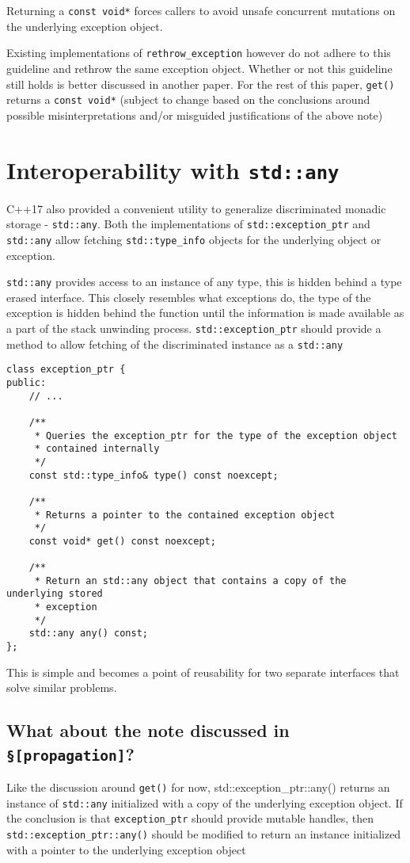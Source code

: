 \documentclass{article}
\begin{document}
Returning a \texttt{const void*} forces callers to avoid unsafe concurrent
mutations on the underlying exception object.

Existing implementations of \texttt{rethrow\_exception} however do not adhere
to this guideline and rethrow the same exception object.  Whether or not this
guideline still holds is better discussed in another paper.  For the rest of
this paper, \texttt{get()} returns a \texttt{const void*} (subject to change
based on the conclusions around possible misinterpretations and/or misguided
justifications of the above note)

\section{Interoperability with \texttt{std::any}}
C++17 also provided a convenient utility to generalize discriminated monadic
storage - \texttt{std::any}.  Both the implementations of
\texttt{std::exception\_ptr} and \texttt{std::any} allow fetching
\texttt{std::type\_info} objects for the underlying object or exception.

\texttt{std::any} provides access to an instance of any type, this is hidden
behind a type erased interface.  This closely resembles what exceptions do,
the type of the exception is hidden behind the function until the information
is made available as a part of the stack unwinding process.
\texttt{std::exception\_ptr} should provide a method to allow fetching of the
discriminated instance as a \texttt{std::any}
\begin{lstlisting}
class exception_ptr {
public:
    // ...

    /**
     * Queries the exception_ptr for the type of the exception object
     * contained internally
     */
    const std::type_info& type() const noexcept;

    /**
     * Returns a pointer to the contained exception object
     */
    const void* get() const noexcept;

    /**
     * Return an std::any object that contains a copy of the underlying stored
     * exception
     */
    std::any any() const;
};
\end{lstlisting}

This is simple and becomes a point of reusability for two separate interfaces
that solve similar problems.

\subsection{What about the note discussed in \texttt{§[propagation]}?}
Like the discussion around \texttt{get()} for now,
{std::exception\_ptr::any()} returns an instance of \texttt{std::any}
initialized with a copy of the underlying exception object.  If the conclusion
is that \texttt{exception\_ptr} should provide mutable handles, then
\texttt{std::exception\_ptr::any()} should be modified to return an instance
initialized with a pointer to the underlying exception object
\end{document}
